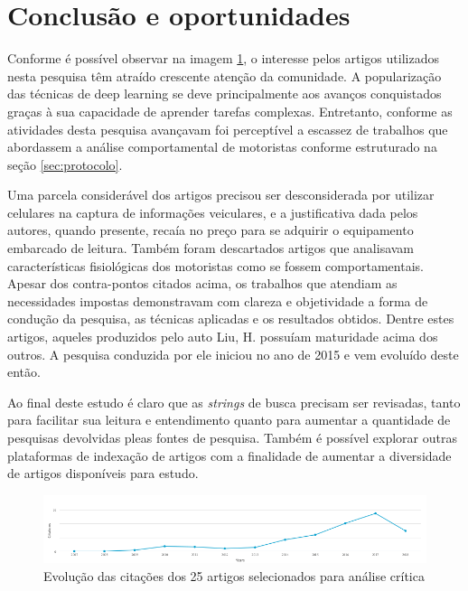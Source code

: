\documentclass[10pt,journal,compsoc]{IEEEtran}
\begin{document}
\section{Conclusão e oportunidades}
\label{sec:conclusao}
Conforme é possível observar na imagem \ref{fig:evolcitacoes}, o
interesse pelos artigos utilizados nesta pesquisa têm atraído
crescente atenção da comunidade. A popularização das técnicas de deep
learning se deve principalmente aos avanços conquistados graças à sua
capacidade de aprender tarefas complexas. Entretanto, conforme as atividades desta
pesquisa avançavam foi perceptível a escassez de trabalhos que
abordassem a análise comportamental de motoristas conforme estruturado
na seção \ref{sec:protocolo}.

Uma parcela considerável dos artigos precisou ser desconsiderada por
utilizar celulares na captura de informações veiculares, e a
justificativa dada pelos autores, quando presente, recaía no preço para se adquirir
o equipamento embarcado de leitura. Também foram descartados artigos
que  analisavam características fisiológicas dos
motoristas como se fossem comportamentais.
Apesar dos contra-pontos citados acima, os trabalhos que atendiam as
necessidades impostas demonstravam com clareza e objetividade a forma
de condução da pesquisa, as técnicas aplicadas e os resultados
obtidos. Dentre estes artigos, aqueles produzidos pelo auto Liu,
H. possuíam maturidade acima dos outros. A pesquisa conduzida por ele
iniciou no ano de 2015 e vem evoluído deste então.

Ao final deste estudo é claro que as \textit{strings} de busca
precisam ser revisadas, tanto para facilitar sua leitura e
entendimento quanto para aumentar a quantidade de pesquisas devolvidas
pleas fontes de pesquisa. Também é possível explorar outras
plataformas de indexação de artigos com a finalidade de aumentar a
diversidade de artigos disponíveis para estudo.

\begin{figure}[!h]
\centering
\includegraphics[scale=1]{evolucao_citacoes}
\caption{Evolução das citações dos 25 artigos selecionados para
  análise crítica}
\label{fig:evolcitacoes}
\end{figure}
\end{document}
